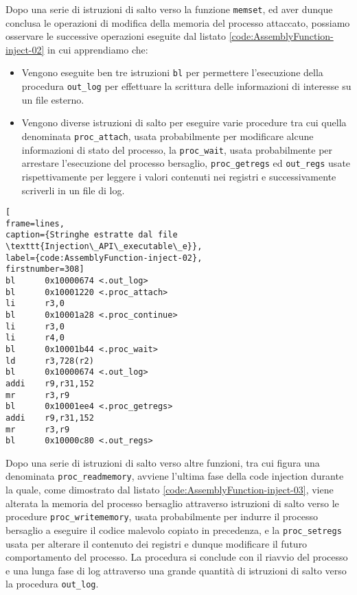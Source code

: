 \documentclass[10pt,a4paper, titlepage]{report}
\begin{document}
Dopo una serie di istruzioni di salto verso la funzione \texttt{memset}, ed aver dunque conclusa le operazioni di modifica della memoria del processo attaccato, possiamo osservare le successive operazioni eseguite dal listato \ref{code:AssemblyFunction-inject-02} in cui apprendiamo che:

\begin{itemize}
\item Vengono eseguite ben tre istruzioni \texttt{bl} per permettere l'esecuzione della procedura \texttt{out\_log} per effettuare la scrittura delle informazioni di interesse su un file esterno.
\item Vengono diverse istruzioni di salto per eseguire varie procedure tra cui quella denominata \texttt{proc\_attach}, usata probabilmente per modificare alcune informazioni di stato del processo, la \texttt{proc\_wait}, usata probabilmente per arrestare l'esecuzione del processo bersaglio, \texttt{proc\_getregs} ed \texttt{out\_regs} usate rispettivamente per leggere i valori contenuti nei registri e successivamente scriverli in un file di log.

\end{itemize}

\begin{lstlisting}[
frame=lines, 
caption={Stringhe estratte dal file \texttt{Injection\_API\_executable\_e}}, 
label={code:AssemblyFunction-inject-02},
firstnumber=308]
bl      0x10000674 <.out_log>
bl      0x10001220 <.proc_attach>
li      r3,0
bl      0x10001a28 <.proc_continue>
li      r3,0
li      r4,0
bl      0x10001b44 <.proc_wait>
ld      r3,728(r2)
bl      0x10000674 <.out_log>
addi    r9,r31,152
mr      r3,r9
bl      0x10001ee4 <.proc_getregs>
addi    r9,r31,152
mr      r3,r9
bl      0x10000c80 <.out_regs>
\end{lstlisting}

Dopo una serie di istruzioni di salto verso altre funzioni, tra cui figura una denominata \texttt{proc\_readmemory}, avviene l'ultima fase della code injection durante la quale, come dimostrato dal listato \ref{code:AssemblyFunction-inject-03}, viene alterata la memoria del processo bersaglio attraverso istruzioni di salto verso le procedure \texttt{proc\_writememory}, usata probabilmente per indurre il processo bersaglio a eseguire il codice malevolo copiato in precedenza, e la \texttt{proc\_setregs} usata per alterare il contenuto dei registri e dunque modificare il futuro comportamento del processo. La procedura si conclude con il riavvio del processo e una lunga fase di log attraverso una grande quantità di istruzioni di salto verso la procedura \texttt{out\_log}.
\end{document}
